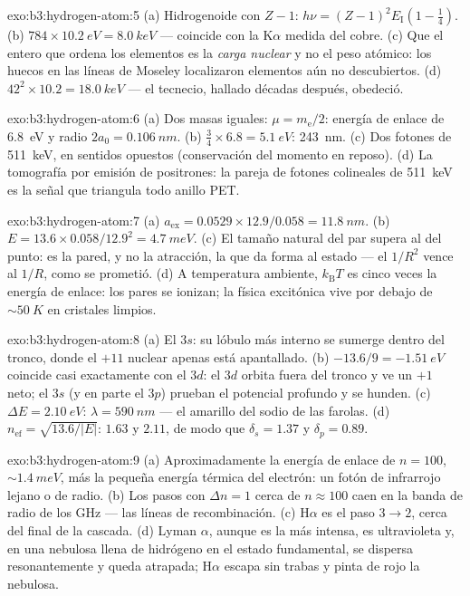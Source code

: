 \begin{solution}{exo:b3:hydrogen-atom:5}
(a) Hidrogenoide con $Z - 1$: $h\nu = (Z-1)^2E_{\text{I}}(1 -
\tfrac14)$. (b) $784 \times \qty{10.2}{eV} = \qty{8.0}{keV}$ ---
coincide con la K$\alpha$ medida del cobre. (c) Que el entero que
ordena los elementos es la \emph{carga nuclear} y no el peso
atómico: los huecos en las líneas de Moseley localizaron elementos aún no
descubiertos. (d) $42^2 \times 10.2 = \qty{18.0}{keV}$ --- el tecnecio,
hallado décadas después, obedeció.
\end{solution}

\begin{solution}{exo:b3:hydrogen-atom:6}
(a) Dos masas iguales: $\mu = m_{\text{e}}/2$: energía de enlace de
\qty{6.8}{eV} y radio $2a_0 = \qty{0.106}{nm}$. (b) $\tfrac34
\times 6.8 = \qty{5.1}{eV}$: \qty{243}{nm}. (c) Dos fotones de
\qty{511}{keV}, en sentidos opuestos (conservación del momento en reposo).
(d) La tomografía por emisión de positrones: la pareja de fotones
colineales de \qty{511}{keV} es la señal que triangula todo anillo PET.
\end{solution}

\begin{solution}{exo:b3:hydrogen-atom:7}
(a) $a_{\text{ex}} = 0.0529 \times 12.9/0.058 = \qty{11.8}{nm}$.
(b) $E = 13.6 \times 0.058/12.9^2 = \qty{4.7}{meV}$. (c) El
tamaño natural del par supera al del punto: es la pared, y no la atracción,
la que da forma al estado --- el $1/R^2$ vence al $1/R$, como se prometió.
(d) A temperatura ambiente, $k_{\text{B}}T$ es cinco veces la energía de enlace: los
pares se ionizan; la física excitónica vive por debajo de
$\sim\qty{50}{K}$ en cristales limpios.
\end{solution}

\begin{solution}{exo:b3:hydrogen-atom:8}
(a) El $3s$: su lóbulo más interno se sumerge dentro del tronco, donde el
$+11$ nuclear apenas está apantallado. (b) $-13.6/9 = \qty{-1.51}{eV}$
coincide casi exactamente con el $3d$: el $3d$ orbita fuera del tronco y ve
un $+1$ neto; el $3s$ (y en parte el $3p$) prueban el potencial profundo y
se hunden. (c) $\Delta E = \qty{2.10}{eV}$: $\lambda = \qty{590}{nm}$
--- el amarillo del sodio de las farolas. (d) $n_{\text{ef}} =
\sqrt{13.6/|E|}$: $1.63$ y $2.11$, de modo que $\delta_s = 1.37$ y
$\delta_p = 0.89$.
\end{solution}

\begin{solution}{exo:b3:hydrogen-atom:9}
(a) Aproximadamente la energía de enlace de $n = 100$, $\sim\qty{1.4}{meV}$, más la
pequeña energía térmica del electrón: un fotón de infrarrojo lejano o de
radio. (b) Los pasos con $\Delta n = 1$ cerca de $n \approx 100$ caen en la
banda de radio de los GHz --- las líneas de recombinación. (c) H$\alpha$ es el paso $3 \to
2$, cerca del final de la cascada. (d) Lyman $\alpha$, aunque
es la más intensa, es ultravioleta y, en una nebulosa llena de hidrógeno en
el estado fundamental, se dispersa resonantemente y queda atrapada;
H$\alpha$ escapa sin trabas y pinta de rojo la nebulosa.
\end{solution}


